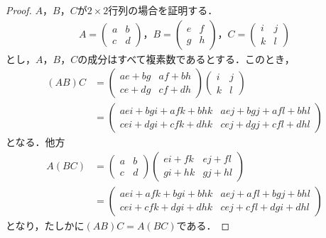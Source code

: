 \documentclass[uplatex,dvipdfmx,a4paper,10pt,fleqn]{jsarticle}
\begin{document}
\begin{tleftbar}
    \begin{proof}
        $A$，$B$，$C$が$2 \times 2$行列の場合を証明する．
        \begin{gather*}
            A=
            \begin{pmatrix}
                a & b \\
                c & d
            \end{pmatrix}
            ，
            B=
            \begin{pmatrix}
                e & f \\
                g & h
            \end{pmatrix}
            ，C=
            \begin{pmatrix}
                i & j \\
                k & l
            \end{pmatrix}
        \end{gather*}
        とし，$A$，$B$，$C$の成分はすべて複素数であるとする．このとき，
        \begin{align*}
            (AB)C & =
            \begin{pmatrix}
                ae+bg & af+bh \\
                ce+dg & cf+dh
            \end{pmatrix}
            \begin{pmatrix}
                i & j \\
                k & l
            \end{pmatrix}
            \\
            & =
            \begin{pmatrix}
                aei +bgi +afk +bhk & aej+bgj+afl+bhl \\
                cei +dgi+cfk +dhk & cej +dgj + cfl +dhl
            \end{pmatrix}
        \end{align*}
            となる．他方
            \begin{align*}
                A(BC)& =
                \begin{pmatrix}
                    a & b \\
                    c & d
                \end{pmatrix}
                \begin{pmatrix}
                    ei + fk & ej +fl \\
                    gi + hk & gj +hl 
                \end{pmatrix}
                \\
                & =
                \begin{pmatrix}
                    aei + afk +bgi +bhk & aej +afl +bgj +bhl \\
                    cei + cfk + dgi +dhk & cej + cfl + dgi +dhl
                \end{pmatrix}
            \end{align*}
            となり，たしかに$(AB)C=A(BC)$である．
        \end{proof}
    \end{tleftbar}
%
\newpage
\end{document}
